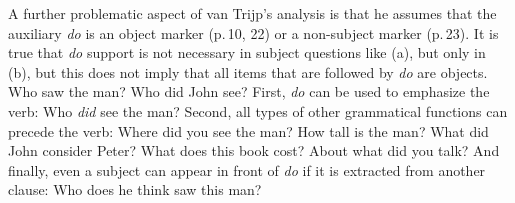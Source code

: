 A further problematic aspect of van Trijp's analysis is that he assumes that the auxiliary \emph{do}
is an object marker (p.\,10, 22) or a non-subject marker (p.\,23). It is true that \emph{do} support is not necessary in subject questions like
(a), but only in (b), but this does not imply that all items that are followed by
\emph{do} are objects.
\eal
\ex Who saw the man?
\ex Who did John see?
\zl
\addlines[2]
First, \emph{do} can be used to emphasize the verb:
\ea
Who \emph{did} see the man?
\z
Second, all types of other grammatical functions can precede the verb:
\eal
\settowidth{}
\ex Where did you see the man? 
\ex How tall is the man? 
\ex What did John consider Peter? 
\ex What does this book cost? 
\ex About what did you talk? 
\zl
And finally, even a subject can appear in front of \emph{do} if it is extracted from another clause:
\ea
\settowidth{}
Who does he think saw this man? 
\z
%
%

